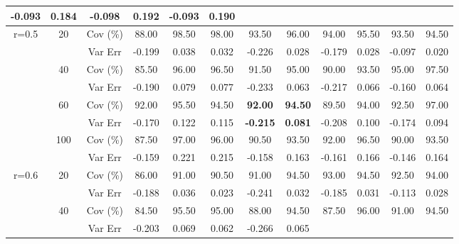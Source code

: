 \begin{table}[!h]
{\begin{tabular}{|c|c|c|c|cccccccc|}
-0.093 &
\multicolumn{1}{c|}{0.184} &
-0.098 &
\multicolumn{1}{c|}{0.192} &
-0.093 &
0.190 \\ \hline
\multirow{8}{*}{r=0.5} &
\multirow{2}{*}{20} &
Cov (\%) &
88.00 &
98.50 &
\multicolumn{1}{c|}{98.00} &
93.50 &
\multicolumn{1}{c|}{96.00} &
94.00 &
\multicolumn{1}{c|}{95.50} &
93.50 &
94.50 \\
&
&
Var Err &
-0.199 &
0.038 &
\multicolumn{1}{c|}{0.032} &
-0.226 &
\multicolumn{1}{c|}{0.028} &
-0.179 &
\multicolumn{1}{c|}{0.028} &
-0.097 &
0.020 \\ \cline{2-12} 
&
\multirow{2}{*}{40} &
Cov (\%) &
85.50 &
96.00 &
\multicolumn{1}{c|}{96.50} &
91.50 &
\multicolumn{1}{c|}{95.00} &
90.00 &
\multicolumn{1}{c|}{93.50} &
95.00 &
97.50 \\
&
&
Var Err &
-0.190 &
0.079 &
\multicolumn{1}{c|}{0.077} &
-0.233 &
\multicolumn{1}{c|}{0.063} &
-0.217 &
\multicolumn{1}{c|}{0.066} &
-0.160 &
0.064 \\ \cline{2-12} 
&
\multirow{2}{*}{60} &
Cov (\%) &
92.00 &
95.50 &
\multicolumn{1}{c|}{94.50} &
\textbf{92.00} &
\multicolumn{1}{c|}{\textbf{94.50}} &
89.50 &
\multicolumn{1}{c|}{94.00} &
92.50 &
97.00 \\
&
&
Var Err &
-0.170 &
0.122 &
\multicolumn{1}{c|}{0.115} &
\textbf{-0.215} &
\multicolumn{1}{c|}{\textbf{0.081}} &
-0.208 &
\multicolumn{1}{c|}{0.100} &
-0.174 &
0.094 \\ \cline{2-12} 
&
\multirow{2}{*}{100} &
Cov (\%) &
87.50 &
97.00 &
\multicolumn{1}{c|}{96.00} &
90.50 &
\multicolumn{1}{c|}{93.50} &
92.00 &
\multicolumn{1}{c|}{96.50} &
90.00 &
93.50 \\
&
&
Var Err &
-0.159 &
0.221 &
\multicolumn{1}{c|}{0.215} &
-0.158 &
\multicolumn{1}{c|}{0.163} &
-0.161 &
\multicolumn{1}{c|}{0.166} &
-0.146 &
0.164 \\ \hline
\multirow{8}{*}{r=0.6} &
\multirow{2}{*}{20} &
Cov (\%) &
86.00 &
91.00 &
\multicolumn{1}{c|}{90.50} &
91.00 &
\multicolumn{1}{c|}{94.50} &
93.00 &
\multicolumn{1}{c|}{94.50} &
92.50 &
94.00 \\
&
&
Var Err &
-0.188 &
0.036 &
\multicolumn{1}{c|}{0.023} &
-0.241 &
\multicolumn{1}{c|}{0.032} &
-0.185 &
\multicolumn{1}{c|}{0.031} &
-0.113 &
0.028 \\ \cline{2-12} 
&
\multirow{2}{*}{40} &
Cov (\%) &
84.50 &
95.50 &
\multicolumn{1}{c|}{95.00} &
88.00 &
\multicolumn{1}{c|}{94.50} &
87.50 &
\multicolumn{1}{c|}{96.00} &
91.00 &
94.50 \\
&
&
Var Err &
-0.203 &
0.069 &
\multicolumn{1}{c|}{0.062} &
-0.266 &
\multicolumn{1}{c|}{0.065} &

\end{tabular}}
\end{table}
